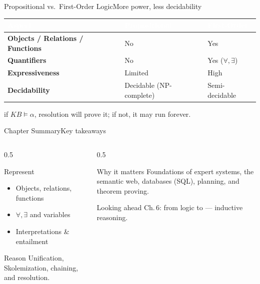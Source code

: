 \documentclass[aspectratio=169,11pt]{beamer}
\begin{document}
\begin{frame}{Propositional vs.\ First-Order Logic}{More power, less decidability}
  \small
  \renewcommand{\arraystretch}{1.3}
  \begin{center}
  \begin{tabularx}{\textwidth}{@{}>{\bfseries}l >{\raggedright\arraybackslash}X >{\raggedright\arraybackslash}X@{}}
    \toprule
    \rowcolor{PrimaryDark}
    \textcolor{white}{Aspect} & \textcolor{white}{Propositional} & \textcolor{white}{First-Order} \\
    \midrule
    Objects / Relations / Functions & No & Yes \\
    \rowcolor{PrimaryLight!25}
    Quantifiers & No & Yes ($\forall,\exists$) \\
    Expressiveness & Limited & High \\
    \rowcolor{PrimaryLight!25}
    Decidability & Decidable (NP-complete) & Semi-decidable \\
    \bottomrule
  \end{tabularx}
  \end{center}
  \begin{center}\scriptsize
     if $KB\models\alpha$, resolution will prove it;
    if not, it may run forever.
  \end{center}
\end{frame}

\begin{frame}{Chapter Summary}{Key takeaways}
  \begin{columns}[T]
    \begin{column}{0.5\textwidth}
      \begin{block}{Represent}
        \small
        \begin{itemize}
          \item Objects, relations, functions
          \item {} $\forall,\exists$ and variables
          \item Interpretations \& entailment
        \end{itemize}
      \end{block}
      \begin{exampleblock}{Reason}
        \small Unification, Skolemization, chaining, and resolution.
      \end{exampleblock}
    \end{column}
    \begin{column}{0.5\textwidth}
      \begin{block}{Why it matters}
        \small Foundations of expert systems, the semantic web, databases (SQL),
        planning, and theorem proving.
      \end{block}
      \begin{alertblock}{Looking ahead}
        \small Ch.\,6: from logic to  — inductive reasoning.
      \end{alertblock}
    \end{column}
  \end{columns}
\end{frame}
\end{document}
